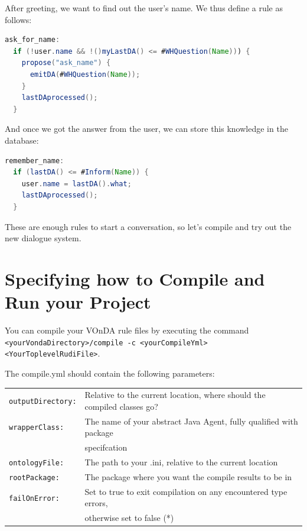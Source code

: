 \documentclass[a4paper]{report}
\newcommand{\vonda}{VOnDA\xspace}
\begin{document}
After greeting, we want to find out the user's name. We thus define a rule as follows:

\begin{lstlisting}[language=Java]
ask_for_name:
  if (!user.name && !()myLastDA() <= #WHQuestion(Name))) {
    propose("ask_name") {
      emitDA(#WHQuestion(Name));
    }
    lastDAprocessed();
  }
\end{lstlisting}

And once we got the answer from the user, we can store this knowledge in the database:

\begin{lstlisting}[language=Java]
remember_name:
  if (lastDA() <= #Inform(Name)) {
    user.name = lastDA().what;
    lastDAprocessed();
  }
\end{lstlisting}

These are enough rules to start a conversation, so let's compile and try out the new dialogue system.

\section{Specifying how to Compile and Run your Project}

You can compile your \vonda rule files by executing the command\\ \verb|<yourVondaDirectory>/compile -c <yourCompileYml> <YourToplevelRudiFile>|.

The compile.yml should contain the following parameters:\\

\begin{tabular}{ll}
	\verb|outputDirectory:| & Relative to the current location, where should the compiled classes go?\\
	\verb|wrapperClass:| & The name of your abstract Java Agent, fully qualified with package \\&specifcation\\
	\verb|ontologyFile:| &The path to your .ini, relative to the current location\\
	\verb|rootPackage:| &The package where you want the compile results to be in\\
	\verb|failOnError:| &Set to true to exit compilation on any encountered type errors,\\& otherwise set to false (*)\\
\end{tabular}\newline
\end{document}
